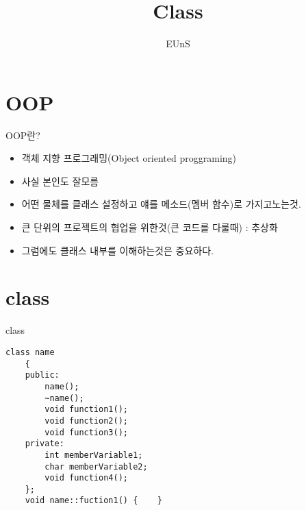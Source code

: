 \documentclass[10pt]{beamer}
\title{Class}
\author{EUnS}
\begin{document}
\begin{frame}
    \maketitle
\end{frame}    

\begin{frame}{}
    \tableofcontents
\end{frame}   

\section{OOP}
\begin{frame}{OOP란?}
    \begin{itemize}
        \item 객체 지향 프로그래밍(Object oriented proggraming)
        \item 사실 본인도 잘모름
        \item 어떤 물체를 클래스 설정하고 얘를 메소드(멤버 함수)로 가지고노는것.
        \item 큰 단위의 프로젝트의 협업을 위한것(큰 코드를 다룰때) : 추상화
        \item 그럼에도 클래스 내부를 이해하는것은 중요하다.
    \end{itemize}
\end{frame}    


\section{class}

\begin{frame}[fragile]{class}
    \begin{lstlisting}[style = CppStyle]
    class name
    {
    public:
        name();
        ~name();
        void function1();
        void function2();
        void function3();
    private:
        int memberVariable1;
        char memberVariable2;
        void function4();
    };
    void name::fuction1() {    }
    \end{lstlisting}
\end{frame}    
\end{document}
